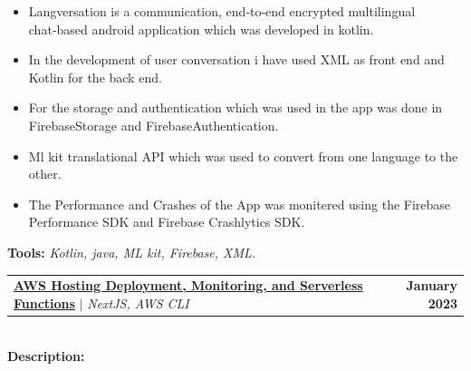 \documentclass[letterpaper,11pt]{article}
\makeatletter
\newcommand{\resumeItem}[1]{
  \item\small{
    {#1 \vspace{-2pt}}
  }
}
\newcommand{\resumeProjectHeading}[2]{
    \item
    \begin{tabular*}{1.001\textwidth}{l@{\extracolsep{\fill}}r}
      \small#1 & \textbf{\small #2}\\
    \end{tabular*}\vspace{-7pt}
}
\newcommand{\resumeItemListStart}{\begin{itemize}}
\newcommand{\resumeItemListEnd}{\end{itemize}\vspace{-5pt}}
\makeatother
\begin{document}
          \vspace{-8pt}
          \resumeItemListStart
            \resumeItem{ Langversation is a communication, end‑to‑end encrypted multilingual chat‑based android application which was developed in kotlin.}
            \resumeItem{In the development of user conversation i have used XML as front end and Kotlin for the back end.}
            \resumeItem{For the storage and authentication which was used in the app was done in FirebaseStorage and FirebaseAuthentication.}
            \resumeItem{Ml kit translational API which was used to convert from one language to the other.}
            \resumeItem{The Performance and Crashes of the App was monitered using the Firebase Performance SDK and Firebase Crashlytics SDK.}
          \resumeItemListEnd 
          \textbf{Tools:}\emph{
Kotlin, java, ML kit, Firebase, XML.}
        \vspace{-18pt}
          
          \resumeProjectHeading
          {\href{https://yakkshit.com}{\textbf{AWS Hosting Deployment, Monitoring, and Serverless Functions}} $|$ \emph{NextJS, AWS CLI}}{January 2023}\\
          \vspace{6pt}
          \textbf{Description:}
          
\end{document}
